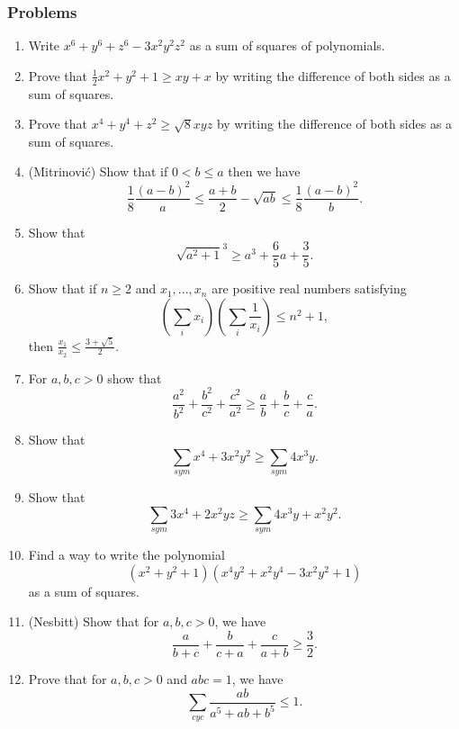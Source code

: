 \subsubsection{Problems}
\begin{enumerate}
\item Write $x^6+y^6+z^6-3x^2y^2z^2$ as a sum of squares of polynomials.

\item Prove that $\frac{1}{2}x^2+y^2+1\ge xy+x$ by writing the difference of both sides as a sum of squares.

\item Prove that $x^4+y^4+z^2 \ge \sqrt{8}xyz$ by writing the difference of both sides as a sum of squares.


\item (Mitrinovi\'c) Show that if $0 < b \le a$ then we have
\[
\frac{1}{8}\frac{(a-b)^2}{a} \le \frac{a+b}{2}-\sqrt{ab} \le \frac{1}{8}\frac{(a-b)^2}{b}.
\]

\item Show that
\[
\sqrt{a^2+1}^3 \ge a^3 + \frac{6}{5}a + \frac{3}{5}.
\]

\item Show that if $n\ge 2$ and $x_1, ..., x_n$ are positive real numbers satisfying
\[
\left(\sum_i x_i\right)\left(\sum_i \frac{1}{x_i}\right) \le n^2+1,
\]
then $\frac{x_1}{x_2} \le \frac{3+\sqrt{5}}{2}$.

\item For $a,b,c>0$ show that
\[
\frac{a^2}{b^2}+\frac{b^2}{c^2}+\frac{c^2}{a^2} \ge \frac{a}{b}+\frac{b}{c}+\frac{c}{a}.
\]

\item Show that
\[
\sum_{sym} x^4+3x^2y^2 \ge \sum_{sym} 4x^3y.
\]

\item Show that
\[
\sum_{sym} 3x^4+2x^2yz \ge \sum_{sym} 4x^3y+x^2y^2.
\]

\item Find a way to write the polynomial
\[
(x^2+y^2+1)(x^4y^2+x^2y^4-3x^2y^2+1)
\]
as a sum of squares.

\item (Nesbitt) Show that for $a,b,c > 0$, we have
\[
\frac{a}{b+c}+\frac{b}{c+a}+\frac{c}{a+b} \ge \frac{3}{2}.
\]

\item Prove that for $a,b,c > 0$ and $abc=1$, we have
\[
\sum_{cyc} \frac{ab}{a^5+ab+b^5} \le 1.
\]


\end{enumerate}

